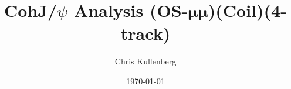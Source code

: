 \title{CohJ/$\psi$ Analysis (\textbf{OS}-$\boldsymbol{\mu\mu}$)(\textbf{Coil})(\textbf{4-track})}
\author{Chris Kullenberg}
\date{\today}
